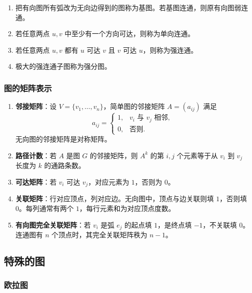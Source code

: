 \begin{enumerate}
	\item 把有向图所有弧改为无向边得到的图称为基图。若基图连通，则原有向图弱连通。
	\item 若任意两点 \(u,v\) 中至少有一个方向可达，则称为单向连通。
	\item 若任意两点 \(u,v\) 都有 \(u\) 可达 \(v\) 且 \(v\) 可达 \(u\)，则称为强连通。
	\item 极大的强连通子图称为强分图。
\end{enumerate}

\subsubsection{图的矩阵表示}

\begin{enumerate}
	\item \textbf{邻接矩阵}：设 \(V=\{v_1,\dots,v_n\}\)，简单图的邻接矩阵 \(A=(a_{ij})\) 满足
	\[
	a_{ij}=
	\begin{cases}
	1,&v_i\text{ 与 }v_j\text{ 相邻},\\
	0,&\text{否则}.
	\end{cases}
	\]
	无向图的邻接矩阵是对称矩阵。
	\item \textbf{路径计数}：若 \(A\) 是图 \(G\) 的邻接矩阵，则 \(A^k\) 的第 \(i,j\) 个元素等于从 \(v_i\) 到 \(v_j\) 长度为 \(k\) 的通路条数。
	\item \textbf{可达矩阵}：若 \(v_i\) 可达 \(v_j\)，对应元素为 \(1\)，否则为 \(0\)。
	\item \textbf{关联矩阵}：行对应顶点，列对应边。无向图中，顶点与边关联则填 \(1\)，否则填 \(0\)。每列通常有两个 \(1\)，每行元素和为对应顶点度数。
	\item \textbf{有向图完全关联矩阵}：若 \(v_i\) 是弧 \(e_j\) 的起点填 \(1\)，是终点填 \(-1\)，不关联填 \(0\)。连通图有 \(n\) 个顶点时，其完全关联矩阵秩为 \(n-1\)。
\end{enumerate}

\subsection{特殊的图}

\subsubsection{欧拉图}


